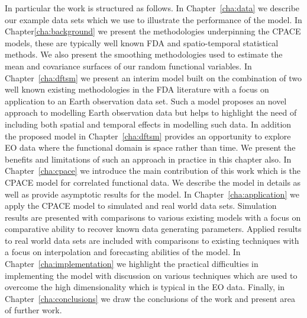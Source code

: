 In particular the work is structured as follows.
In Chapter~\ref{cha:data} we describe our example data sets which we use to illustrate the performance of the model.
In Chapter\ref{cha:background} we present the methodologies underpinning the CPACE models, these are typically well known FDA and spatio-temporal statistical methods.
We also present the smoothing methodologies used to estimate the mean and covariance surfaces of our random functional variables.
In Chapter~\ref{cha:dftsm} we present an interim model built on the combination of two well known existing methodologies in the FDA literature with a focus on application to an Earth observation data set.
Such a model proposes an novel approach to modelling Earth observation data but helps to highlight the need of including both spatial and temporal effects in modelling such data.
In addition the proposed model in Chapter~\ref{cha:dftsm} provides an opportunity to explore EO data where the functional domain is space rather than time.
We present the benefits and limitations of such an approach in practice in this chapter also.
In Chapter~\ref{cha:cpace} we introduce the main contribution of this work which is the CPACE model for correlated functional data.
We describe the model in details as well as provide asymptotic results for the model.
In Chapter~\ref{cha:application} we apply the CPACE model to simulated and real world data sets.
Simulation results are presented with comparisons to various existing models with a focus on comparative ability to recover known data generating parameters.
Applied results to real world data sets are included with comparisons to existing techniques with a focus on interpolation and forecasting abilities of the model.
In Chapter~\ref{cha:implementation} we highlight the practical difficulties in implementing the model with discussion on various techniques which are used to overcome the high dimensionality which is typical in the EO data.
Finally, in Chapter~\ref{cha:conclusions} we draw the conclusions of the work and present area of further work. 